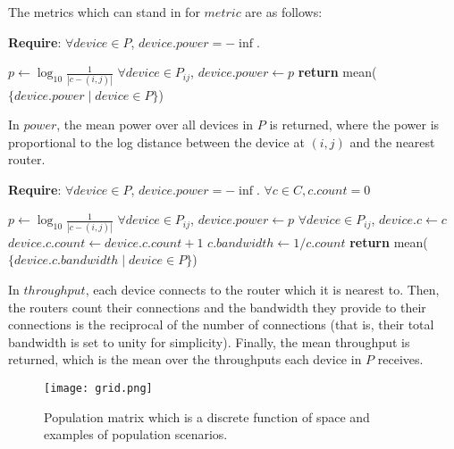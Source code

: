 \documentclass[conference]{IEEEtran}
\begin{document}
The metrics which can stand in for $metric$ are as follows:

\begin{algorithm}[H]
    \textbf{Require}: $\forall device \in P$, $device.power = -\inf$.
    \caption{$power(P_{ij}, C)$}
    \begin{algorithmic}[1]
                \State $p \gets \log_{10}{\frac{1}{|c - (i, j)|}}$
                    \State $\forall device \in P_{ij}$, $device.power \gets p$
                \EndIf
            \EndFor 
        \EndFor
        \State \textbf{return} mean($\{device.power \mid device \in P\}$)
    \end{algorithmic}
\end{algorithm}
In $power$, the mean power over all devices in $P$ is returned, where the power is proportional to the log distance between the device at $(i, j)$ and the nearest router.

\begin{algorithm}[H]
    \textbf{Require}: $\forall device \in P$, $device.power = -\inf$. $\forall c \in C, c.count = 0$
    \caption{$throughput(P_{ij}, C)$}
    \begin{algorithmic}[1]
                \State $p \gets \log_{10}{\frac{1}{|c - (i, j)|}}$
                    \State $\forall device \in P_{ij}$, $device.power \gets p$
                    \State $\forall device \in P_{ij}$, $device.c \gets c$
                \EndIf
            \EndFor 
        \EndFor
            \State $device.c.count \gets device.c.count + 1$
        \EndFor
            \State $c.bandwidth \gets 1 / c.count$
        \EndFor
        \State \textbf{return} mean($\{device.c.bandwidth \mid device \in P\}$)
    \end{algorithmic}
\end{algorithm}
In $throughput$, each device connects to the router which it is nearest to. Then, the routers count their connections and the bandwidth they provide to their connections is the reciprocal of the number of connections (that is, their total bandwidth is set to unity for simplicity). Finally, the mean throughput is returned, which is the mean over the throughputs each device in $P$ receives.
                
\begin{figure}[htbp]
  \centerline{\texttt{[image: grid.png]}}
  \caption{Population matrix which is a discrete function of space and examples
  of population scenarios.}
  \label{grid}
\end{figure}
\end{document}

